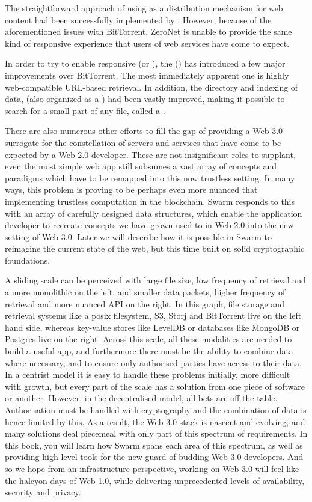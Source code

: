 The straightforward approach of using  as a distribution mechanism for web content had been successfully implemented by  \cite{zeronet}. However, because of the aforementioned issues with BitTorrent, ZeroNet is unable to provide the same kind of responsive experience that users of web services have come to expect. 

In order to try to enable responsive  (or ), the  () \cite{ipfs2014} has introduced a few major improvements over BitTorrent. The most immediately apparent one is highly web-compatible URL-based retrieval. In addition, the directory and indexing of data, (also organized as a ) had been vastly improved, making it possible to search for a small part of any file, called a .

There are also numerous other efforts to fill the gap of providing a Web 3.0 surrogate for the constellation of servers and services that have come to be expected by a Web 2.0 developer. These are not insignificant roles to supplant, even the most simple web app still subsumes a vast array of concepts and paradigms which have to be remapped into this now trustless setting. In many ways, this problem is proving to be perhaps even more nuanced that implementing trustless computation in the blockchain. Swarm responds to this with an array of carefully designed data structures, which enable the application developer to recreate concepts we have grown used to in Web 2.0 into the new setting of Web 3.0. Later we will describe how it is possible in Swarm to reimagine the current state of the web, but this time built on solid cryptographic foundations.

A sliding scale can be perceived with large file size, low frequency of retrieval and a more monolithic  on the left, and smaller data packets, higher frequency of retrieval and more nuanced API on the right. In this graph, file storage and retrieval systems like a posix filesystem, S3, Storj and BitTorrent live on the left hand side, whereas key-value stores like LevelDB or databases like MongoDB or Postgres live on the right. Across this scale, all these modalities are needed to build a useful app, and furthermore there must be the ability to combine data where necessary, and to ensure only authorised parties have access to their data. In a centrist model it is easy to handle these problems initially, more difficult with growth, but every part of the scale has a solution from one piece of software or another. However, in the decentralised model, all bets are off the table. Authorisation must be handled with cryptography and the combination of data is hence limited by this. As a result, the Web 3.0 stack is nascent and evolving, and many solutions deal piecemeal with only part of this spectrum of requirements. In this book, you will learn how Swarm spans each area of this spectrum, as well as providing high level tools for the new guard of budding Web 3.0 developers. And so we hope from an infrastructure perspective, working on Web 3.0 will feel like the halcyon days of Web 1.0, while delivering unprecedented levels of availability, security and privacy.

